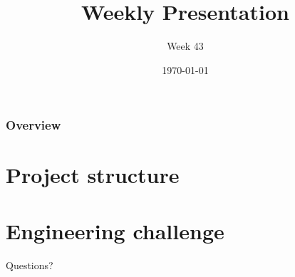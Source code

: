\documentclass{beamer}
\title{Weekly Presentation}
\subtitle{Week 43}
\author{}
\institute{Luleå University of Technology}
\date{\today}
\begin{document}
\begin{frame}
    \titlepage
\end{frame}

\begin{frame}
    \frametitle{Overview}
    \tableofcontents
\end{frame}

\section{Project structure}



\section{Engineering challenge}




\begin{frame}
    \begin{center}
        \Huge Questions?
    \end{center}
\end{frame}
\end{document}
